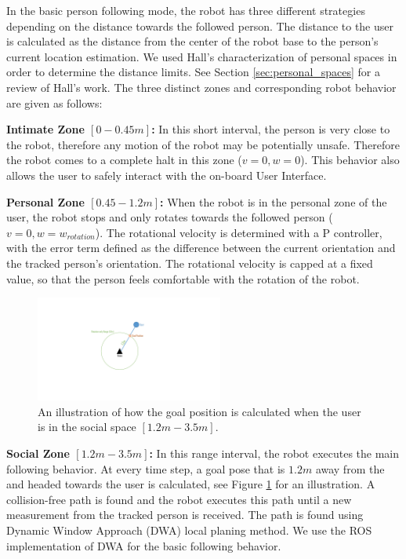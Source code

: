 In the basic person following mode, the robot has three different strategies depending on the distance towards the followed person. The distance to the user is calculated as the distance from the center of the robot base to the person's current location estimation. We used Hall's characterization of personal spaces in order to determine the distance limits. See Section \ref{sec:personal_spaces} for a review of Hall's work. The three distinct zones and corresponding robot behavior are given as follows:

\textbf{Intimate Zone $[0-0.45m]$:} In this short interval, the person is very close to the robot, therefore any motion of the robot may be potentially unsafe. Therefore the robot comes to a complete halt in this zone ($v=0,w=0$). This behavior also allows the user to safely interact with the on-board User Interface.

\textbf{Personal Zone $[0.45-1.2m]$:} When the robot is in the personal zone of the user, the robot stops and only rotates towards the followed person ($v=0,w=w_{rotation}$). The rotational velocity is determined with a P controller, with the error term defined as the difference between the current orientation and the tracked person's orientation. The rotational velocity is capped at a fixed value, so that the person feels comfortable with the rotation of the robot.

\begin{figure}[h!]
\centering
\includegraphics[width=0.55\textwidth]{pics/following_1m_cropped}
\caption{An illustration of how the goal position is calculated when the user is in the social space $[1.2m-3.5m]$.}
\label{fig:following_1m}
\end{figure}

\textbf{Social Zone $[1.2m-3.5m]$: } In this range interval, the robot executes the main following behavior. At every time step, a goal pose that is $1.2m$ away from the and headed towards the user is calculated, see Figure \ref{fig:following_1m} for an illustration. A collision-free path is found and the robot executes this path until a new measurement from the tracked person is received. The path is found using Dynamic Window Approach (DWA) local planing method. We use the ROS implementation of DWA for the basic following behavior.

